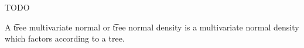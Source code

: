 

TODO


A \t{tree multivariate normal} or \t{tree normal} density is a multivariate normal density which factors according to a tree.
